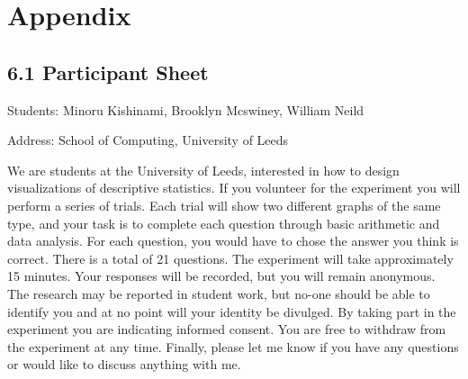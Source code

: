 \section{Appendix}
\subsection*{6.1 Participant Sheet}
\flushleft
Students: Minoru Kishinami, Brooklyn Mcswiney, William Neild

Address: School of Computing, University of Leeds
\medskip
 
\quad We are students at the University of Leeds, interested in how to design visualizations of descriptive statistics. If you volunteer for the experiment you will perform a series of trials. Each trial will show two different graphs of the same type, and your task is to complete each question through basic arithmetic and data analysis. For each question, you would have to chose the answer you think is correct. There is a total of 21 questions.
The experiment will take approximately 15 minutes. Your responses will be recorded, but you will remain anonymous. The research may be reported in student work, but no-one should be able to identify you and at no point will your identity be divulged.
By taking part in the experiment you are indicating informed consent. You are free to withdraw from the experiment at any time. 
Finally, please let me know if you have any questions or would like to discuss anything with me.
\flushleft
